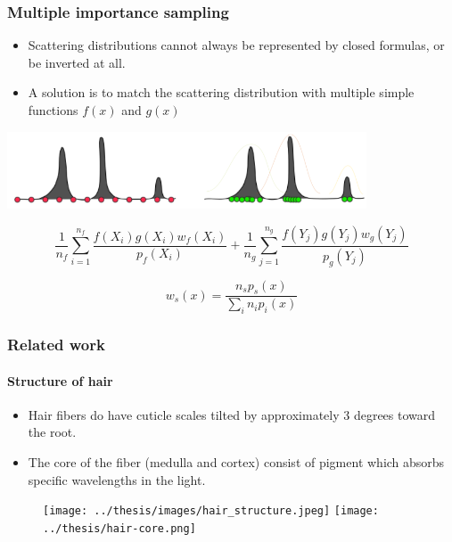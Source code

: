 \documentclass{beamer}
\begin{document}
    
  \begin{frame}
    \frametitle{Multiple importance sampling}
    
    \begin{itemize}
    \item Scattering distributions cannot always be represented by closed formulas, or be inverted at all.
    
    \item A solution is to match the scattering distribution with multiple simple functions $f(x)$ and $g(x)$
    \end{itemize}
    
        \includegraphics[width=0.8\textwidth,center]{importance_sampling_px.png}
    
    \begin{equation}
\frac{1}{n_f} \sum_{i=1}^{n_f} \frac{f(X_i)g(X_i) w_f(X_i)}{p_f(X_i)} + 
\frac{1}{n_g} \sum_{j=1}^{n_g} \frac{f(Y_j)g(Y_j) w_g(Y_j)}{p_g(Y_j)} 
\end{equation}

\begin{equation}
w_s(x) = \frac{n_sp_s(x)}{\sum_i n_i p_i(x)}
\end{equation}

    
  \end{frame}

  
  \begin{frame}
    \frametitle{Related work}
	\framesubtitle{Structure of hair}
	
	\begin{itemize}
	\item Hair fibers do have cuticle scales tilted by approximately 3 degrees toward the root.
	\item The core of the fiber (medulla and cortex) consist of pigment which absorbs specific wavelengths in the light.
	\end{itemize}
	
	\begin{figure}
	\texttt{[image: ../thesis/images/hair\_structure.jpeg]}
	\texttt{[image: ../thesis/hair-core.png]}
	\end{figure}
  \end{frame}
  
\end{document}
